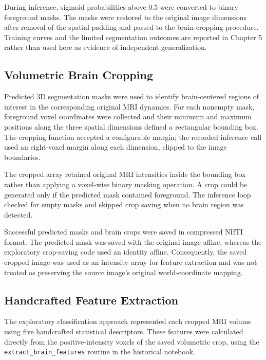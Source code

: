 During inference, sigmoid probabilities above 0.5 were converted to binary foreground masks. The masks were restored to the original image dimensions after removal of the spatial padding and passed to the brain-cropping procedure. Training curves and the limited segmentation outcomes are reported in Chapter 5 rather than used here as evidence of independent generalization.

\subsection{Volumetric Brain Cropping}
\label{subsec:preliminary_3d_cropping}

Predicted 3D segmentation masks were used to identify brain-centered regions of interest in the corresponding original MRI dynamics. For each nonempty mask, foreground voxel coordinates were collected and their minimum and maximum positions along the three spatial dimensions defined a rectangular bounding box. The cropping function accepted a configurable margin; the recorded inference call used an eight-voxel margin along each dimension, clipped to the image boundaries.

The cropped array retained original MRI intensities inside the bounding box rather than applying a voxel-wise binary masking operation. A crop could be generated only if the predicted mask contained foreground. The inference loop checked for empty masks and skipped crop saving when no brain region was detected.

Successful predicted masks and brain crops were saved in compressed NIfTI format. The predicted mask was saved with the original image affine, whereas the exploratory crop-saving code used an identity affine. Consequently, the saved cropped image was used as an intensity array for feature extraction and was not treated as preserving the source image's original world-coordinate mapping.

\subsection{Handcrafted Feature Extraction}
\label{subsec:preliminary_3d_features}

The exploratory classification approach represented each cropped MRI volume using five handcrafted statistical descriptors. These features were calculated directly from the positive-intensity voxels of the saved volumetric crop, using the \texttt{extract\_brain\_features} routine in the historical notebook.

